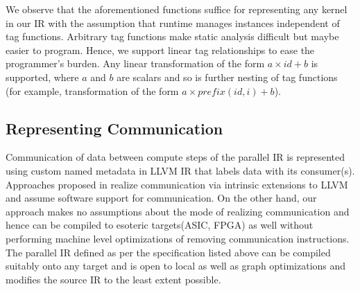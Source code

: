 We observe that the aforementioned functions suffice for representing any kernel in our IR with the assumption that runtime manages instances independent of tag functions. Arbitrary tag functions make static analysis difficult but maybe easier to program. Hence, we support linear tag relationships to ease the programmer's burden. Any linear transformation of the form $a\times id + b $ is supported, where $a$ and $b$ are scalars and so is further nesting of tag functions (for example, transformation of the form $a\times prefix(id, i) + b $).

\subsection{Representing Communication}
Communication of data between compute steps of the parallel IR is represented using custom named metadata in LLVM IR that labels data with its consumer(s). Approaches proposed in \cite{} realize communication via intrinsic extensions to LLVM and assume software support for communication. On the other hand, our approach makes no assumptions about the mode of realizing communication and hence can be compiled to esoteric targets(ASIC, FPGA) as well without performing machine level optimizations of removing communication instructions. The parallel IR defined as per the specification listed above can be compiled suitably onto any target and is open to local as well as graph optimizations and modifies the source IR to the least extent possible. 

